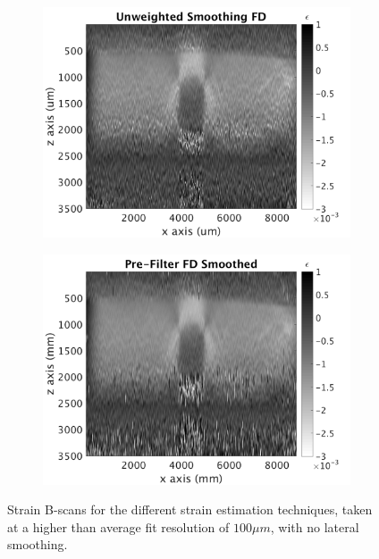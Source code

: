 \begin{figure}[h]
\begin{subfigure}{0.49\textwidth}
        \includegraphics[width=\textwidth]{appendix_figs/uwfd_fr100_lr0.png}
    \end{subfigure}
    \begin{subfigure}{0.49\textwidth}
    	\centering
        \includegraphics[width=\textwidth]{appendix_figs/fdsm_fr100_lr0.png}
    \end{subfigure}    
    \label{images_high_fitres}
    \caption{Strain B-scans for the different strain estimation techniques, taken at a higher than average fit resolution of $100\mu m$, with no lateral smoothing.}
\end{figure}

